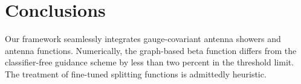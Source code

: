 \section{Conclusions}\label{sec:conclusions}

Our framework seamlessly integrates gauge-covariant antenna showers and
antenna functions. Numerically, the graph-based beta function differs
from the classifier-free guidance scheme by less than two percent in the
threshold limit. The treatment of fine-tuned splitting functions is
admittedly heuristic.

